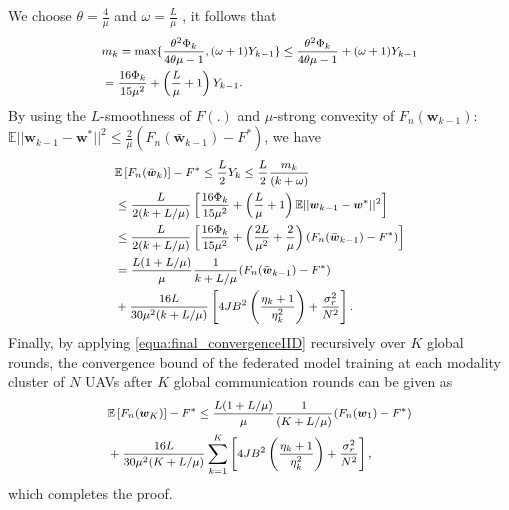 We choose $\theta = \frac{4}{\mu}$ and $\omega = \frac{L}{\mu}$ , it follows that
\begin{equation}  \footnotesize
\begin{aligned}
&m_k =\max \{\frac{\theta^2\Phi_k}{4\theta\mu-1}, (\omega+1)Y_{k-1}\} \leq \frac{\theta^2\Phi_k}{4\theta\mu-1} + (\omega+1)Y_{k-1} 
\\&= \frac{16\Phi_k}{15\mu^2} + \left( \frac{L}{\mu}+1\right)Y_{k-1}.
\end{aligned}
\end{equation}
By using the $L$-smoothness of $F(.)$ and $\mu$-strong convexity of $F_{n}(\boldsymbol{w}_{k-1})$: $\mathbb{E}||\boldsymbol{w}_{k-1} - \boldsymbol{w}^*||^2 \leq \frac{2}{\mu}(F_{n}(\bar{\boldsymbol{w}}_{k-1}) -F^*)$, we have
\begin{equation} \footnotesize \label{equa:final_convergenceIID}
\begin{aligned}
&\mathbb{E}\left[F_{n}(\bar{\boldsymbol{w}}_k)\right] -F^* \leq \frac{L}{2}Y_k\leq \frac{L}{2}\frac{m_k}{(k+\omega)} 
\\&\leq \frac{L}{2(k+L/\mu)}\left[\frac{16\Phi_k}{15\mu^2} + \left( \frac{L}{\mu}+1\right) \mathbb{E}||\boldsymbol{w}_{k-1} - \boldsymbol{w}^*||^2 \right]
 \\& \leq \frac{L}{2(k+L/\mu)}\left[\frac{16\Phi_k}{15\mu^2} + \left( \frac{2L}{\mu^2}+\frac{2}{\mu}\right) (F_{n}(\bar{\boldsymbol{w}}_{k-1}) -F^*) \right]
\\& = \frac{L(1+L/\mu)}{\mu}\frac{1}{k+L/\mu}(F_{n}(\bar{\boldsymbol{w}}_{k-1}) -F^*) 
\\&+ \frac{16L}{30\mu^2(k+L/\mu)} \left[ 4JB^2 \left(\frac{\eta_k+1}{\eta_k^2} \right)+ \frac{\sigma_r^2}{N^2}  \right].
\end{aligned} 
\end{equation}
Finally, by applying \eqref{equa:final_convergenceIID} recursively over $K$ global rounds, the convergence bound of the federated model training at each modality cluster of $N$ UAVs after $K$ global communication rounds can be given as 
\begin{equation} \footnotesize \label{equa:final_convergenceFunction}
\begin{aligned}
&\mathbb{E}\left[F_n(\boldsymbol{w}_K)\right] -F^* \leq \frac{L(1+L/\mu)}{\mu}\frac{1}{(K+L/\mu)} (F_n(\boldsymbol{w}_1) -F^*)
 \\&+\frac{16L}{30\mu^2(K+L/\mu)}\sum_{k=1}^{K} \left[4JB^2 \left(\frac{\eta_k+1}{\eta_k^2} \right) +\frac{\sigma_r^2}{N^2} \right],
\end{aligned}
\end{equation}
which completes the proof.


